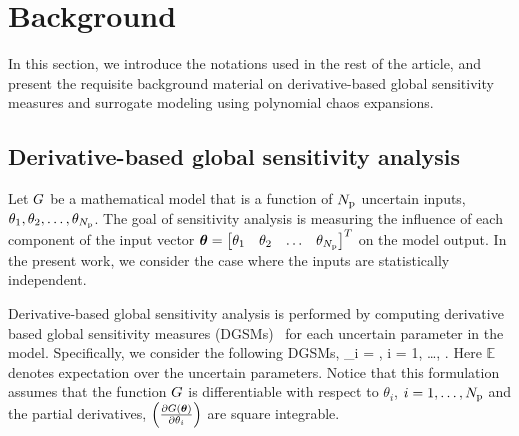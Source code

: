 \section{Background}
\label{sec:bg}

In this section, we introduce the notations used in the rest of
the article, and present the requisite background material on 
derivative-based global sensitivity measures and surrogate modeling 
using polynomial chaos expansions.

\subsection{Derivative-based global sensitivity analysis}  
\label{sub:dgsm}

Let $G$ be a mathematical model that is a function of ${N_\text{p}}$ uncertain 
inputs, $\theta_1, \theta_2, \ldots, \theta_{N_\text{p}}$. The goal of sensitivity analysis
is measuring the influence of each component of the input vector 
$\bm{\theta} = \begin{bmatrix}\theta_1 & \theta_2 & 
\ldots & \theta_{N_\text{p}}\end{bmatrix}^T$ on the model output. 
In the present work, we consider the case where the inputs are statistically 
independent. 

Derivative-based global sensitivity analysis is performed by 
computing derivative based global sensitivity measures (DGSMs)~\cite{Sobol:2009} 
for each uncertain parameter in the model. 
Specifically, we consider the following DGSMs, 
\be
\mu_i = 
, \quad i = 1, \ldots, \Np.
\label{eq:mu}
\ee
Here $\mathbb{E}$ denotes expectation over the uncertain parameters.
Notice that this formulation assumes that the function $G$ is differentiable
with respect to $\theta_i$, $i = 1, \ldots, {N_\text{p}}$ and the partial derivatives,
$\left(\frac{\partial G(\bm{\bm{\theta}})}{\partial \theta_i}\right)$ are 
square integrable. 

